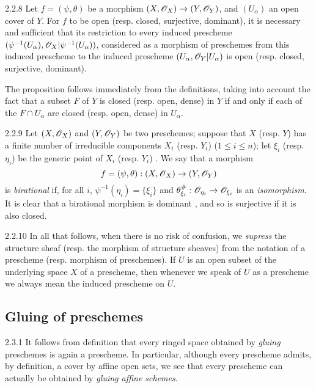 \documentclass[10pt,oneside]{book}
\begin{document}
\begin{envs}[Proposition]{2.2.8}
\label{prop-1.2.2.8}
Let $f=(\psi,\theta)$ be a morphism
$(X,\mathscr{O}_X)\to(Y,\mathscr{O}_Y)$, and $(U_\alpha)$ an open cover of $Y$. For $f$ to be
open (resp. closed, surjective, dominant), it is necessary and sufficient that
its restriction to every induced prescheme
$(\psi^{-1}(U_\alpha),\mathscr{O}_X|\psi^{-1}(U_\alpha))$, considered as a morphism of
preschemes from this induced prescheme to the induced prescheme
$(U_\alpha,\mathscr{O}_Y|U_\alpha)$ is open (resp. closed, surjective, dominant).
\end{envs}

The proposition follows immediately from the definitions, taking into
account the fact that a subset $F$ of $Y$ is closed (resp. open, dense) in $Y$
if and only if each of the $F\cap U_\alpha$ are closed (resp. open, dense) in
$U_\alpha$.

\begin{env}{2.2.9}
\label{env-1.2.2.9}
Let $(X,\mathscr{O}_X)$ and $(Y,\mathscr{O}_Y)$ be two preschemes; suppose that
$X$ (resp. $Y$) has a finite number of irreducible components $X_i$ (resp.
$Y_i$) ($1\leqslant i\leqslant n$); let $\xi_i$ (resp. $\eta_i$) be the generic
point of $X_i$ (resp. $Y_i$) . We say that a morphism
\[
  f=(\psi,\theta):(X,\mathscr{O}_X)\to(Y,\mathscr{O}_Y)
\]
is \emph{birational} if, for all $i$, $\psi^{-1}(\eta_i)=\{\xi_i\}$ and
$\theta_{\xi_i}^\#:\mathscr{O}_{\eta_i}\to\mathscr{O}_{\xi_i}$ is an \emph{isomorphism}. It
is clear that a birational morphism is dominant , and so is
surjective if it is also closed.
\end{env}

\begin{env}{2.2.10}
\label{rmk-1.2.2.10}
In all that follows, when there is
no risk of confusion, we \emph{supress} the structure sheaf (resp. the morphism
of structure sheaves) from the notation of a prescheme (resp. morphism of
preschemes). If $U$ is an open subset of the underlying space $X$ of a
prescheme, then whenever we speak of $U$ as a prescheme we always mean the
induced prescheme on $U$.
\end{env}

\subsection{Gluing of preschemes}
\label{1-schemes-2.3}

\begin{env}{2.3.1}
\label{env-1.2.3.1}
It follows from definition  that every ringed space obtained by
\emph{gluing} preschemes  is again a prescheme. In particular, although
every prescheme admits, by definition, a cover by affine open sets, we see that every
prescheme can actually be obtained by \emph{gluing affine schemes}.
\end{env}
\end{document}
